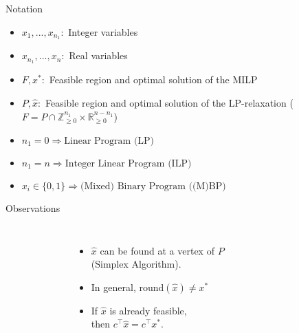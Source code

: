 \begin{frame}{Notation}

\begin{itemize}
\item $x_1,...,x_{n_1}:$ Integer variables
\item $x_{n_1},...,x_n:$ Real variables
\item $F, x^*:$ Feasible region and optimal solution of the MILP
\item $P, \hat{x}:$ Feasible region and optimal solution of the LP-relaxation ($F = P \cap \mathbb{Z}_{\geq 0}^{n_1} \times \mathbb{R}_{\geq 0}^{n-n_1}$)
\end{itemize}

\begin{itemize}
\item $n_1 = 0 \Rightarrow \text{Linear Program (LP)}$
\item $n_1 = n \Rightarrow \text{Integer Linear Program (ILP)}$
\item $x_i \in \{0,1\}\Rightarrow \text{(Mixed) Binary Program ((M)BP)}$
\end{itemize}

\end{frame}

\begin{frame}{Observations}
\begin{columns}
\begin{figure}[p]
        \centering
        
    \end{figure}

\begin{itemize}[<+->]
\item $\hat{x}$ can be found at a vertex of $P$\\
(Simplex Algorithm).

\item In general, $\text{round}(\hat{x}) \neq x^*$


\item If $\hat{x}$ is already feasible,\\
then $c^\top \hat{x} = c^\top x^*$.


\end{itemize}
\end{columns}
	
\end{frame}
